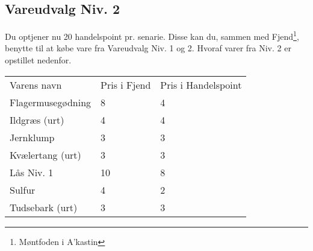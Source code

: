 \subsection{Vareudvalg Niv. 2}
Du optjener nu 20 handelspoint pr. senarie. Disse kan du, sammen med Fjend\footnote{Møntfoden i A'kastin}, benytte til at købe vare fra Vareudvalg Niv. 1 og 2. Hvoraf varer fra Niv. 2 er opstillet nedenfor.
\begin{table}[H]
    \centering
    \begin{tabular}{|p{}|p{}|p{}|}
    \hline
    \rowcolor{cerulean!80}
    \multicolumn{3}{c}{Vareudvalg Niv. 2}\\
    \hline
    \rowcolor{cerulean!40}
         Varens navn & Pris i Fjend & Pris i Handelspoint \\\hline
         Flagermusegødning & 8 & 4\\\hline
         Ildgræs (urt) & 4 & 4\\\hline
         Jernklump & 3 & 3\\\hline
         Kvælertang (urt) & 3 & 3\\\hline
         Lås Niv. 1 & 10 & 8\\\hline
         Sulfur & 4 & 2\\\hline
         Tudsebark (urt) & 3 & 3\\\hline
    \end{tabular}
    \end{table}